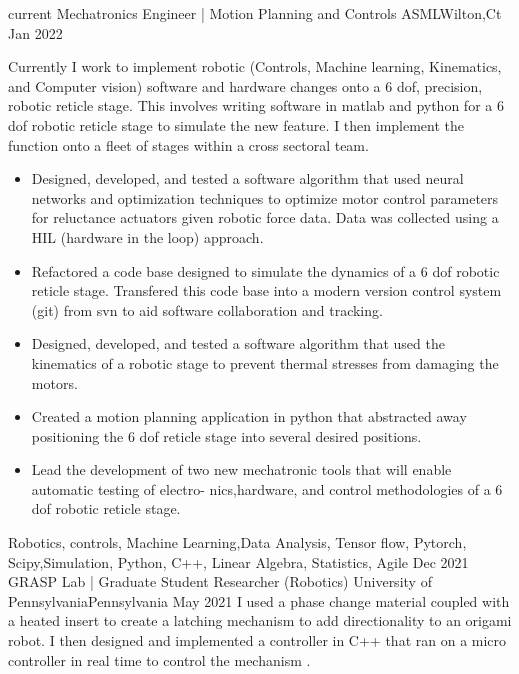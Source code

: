 \begin{experiences}

\experience
  {current}      {Mechatronics Engineer |  Motion Planning and Controls }{ASML}{Wilton,Ct}
  {Jan 2022} {Currently I work to implement robotic (Controls, Machine learning, Kinematics, and Computer vision) software and hardware changes onto a 6 dof, precision, robotic reticle stage. This involves writing software in matlab and python for a 6 dof robotic reticle stage to simulate the new feature. I then implement the function onto a fleet of stages within a cross sectoral team. 
			\begin{itemize}
			\item Designed, developed, and tested  a software algorithm  that used neural networks and optimization techniques to optimize motor control 					parameters for reluctance actuators given robotic force data. Data was collected using a HIL (hardware in the loop) approach. 
			\item Refactored a code base designed to simulate the dynamics of a 6 dof robotic reticle stage. Transfered this code base into a modern version 					control system (git) from svn to aid software collaboration and tracking.
			\item Designed, developed, and tested a software algorithm that used the kinematics of a robotic stage to prevent thermal stresses 						from damaging the motors. 
           		\item Created a motion planning application in python that abstracted away positioning the 6 dof reticle stage into several desired positions.
           		\item Lead the development of two new mechatronic tools that will enable automatic testing of electro-
nics,hardware, and control methodologies of a 6 dof robotic reticle stage.
		 	\end{itemize} 
                 }
                {Robotics, controls, Machine Learning,Data Analysis, Tensor flow, Pytorch, Scipy,Simulation, Python, C++, Linear Algebra, Statistics, Agile}   
 \experience
    {Dec 2021}     {GRASP Lab | Graduate Student Researcher (Robotics)  }{ University of Pennsylvania}{Pennsylvania}
    {May 2021}    {I used a phase change material coupled with a heated insert to create a latching mechanism to add directionality to an origami robot. I then designed and implemented a controller in C++ that ran on a micro controller in real time to control the mechanism .
}
\end{experiences}
